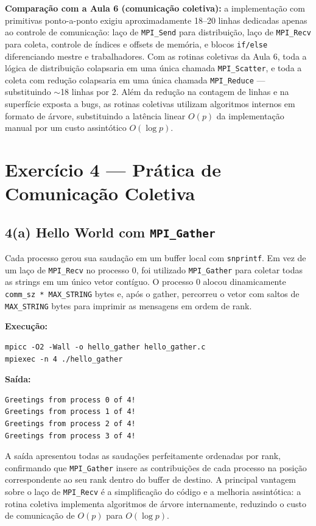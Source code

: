 \documentclass[12pt,a4paper]{article}
\begin{document}
\textbf{Comparação com a Aula 6 (comunicação coletiva):} a implementação com primitivas ponto-a-ponto exigiu aproximadamente 18–20 linhas dedicadas apenas ao controle de comunicação: laço de \texttt{MPI\_Send} para distribuição, laço de \texttt{MPI\_Recv} para coleta, controle de índices e offsets de memória, e blocos \texttt{if/else} diferenciando mestre e trabalhadores. Com as rotinas coletivas da Aula 6, toda a lógica de distribuição colapsaria em uma única chamada \texttt{MPI\_Scatter}, e toda a coleta com redução colapsaria em uma única chamada \texttt{MPI\_Reduce} — substituindo $\sim$18 linhas por 2. Além da redução na contagem de linhas e na superfície exposta a bugs, as rotinas coletivas utilizam algoritmos internos em formato de árvore, substituindo a latência linear $O(p)$ da implementação manual por um custo assintótico $O(\log p)$.

\section{Exercício 4 — Prática de Comunicação Coletiva}

\subsection{4(a) Hello World com \texttt{MPI\_Gather}}

Cada processo gerou sua saudação em um buffer local com \texttt{snprintf}. Em vez de um laço de \texttt{MPI\_Recv} no processo 0, foi utilizado \texttt{MPI\_Gather} para coletar todas as strings em um único vetor contíguo. O processo 0 alocou dinamicamente \texttt{comm\_sz * MAX\_STRING} bytes e, após o gather, percorreu o vetor com saltos de \texttt{MAX\_STRING} bytes para imprimir as mensagens em ordem de rank.

\textbf{Execução:}
\begin{lstlisting}[style=shell]
mpicc -O2 -Wall -o hello_gather hello_gather.c
mpiexec -n 4 ./hello_gather
\end{lstlisting}

\textbf{Saída:}
\begin{lstlisting}[style=shell]
Greetings from process 0 of 4!
Greetings from process 1 of 4!
Greetings from process 2 of 4!
Greetings from process 3 of 4!
\end{lstlisting}

A saída apresentou todas as saudações perfeitamente ordenadas por rank, confirmando que \texttt{MPI\_Gather} insere as contribuições de cada processo na posição correspondente ao seu rank dentro do buffer de destino. A principal vantagem sobre o laço de \texttt{MPI\_Recv} é a simplificação do código e a melhoria assintótica: a rotina coletiva implementa algoritmos de árvore internamente, reduzindo o custo de comunicação de $O(p)$ para $O(\log p)$.
\end{document}
